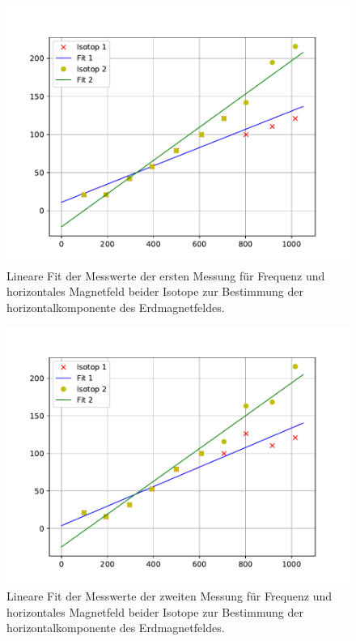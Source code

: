 \begin{figure}[H]
  \centering
  \includegraphics[width=\textwidth]{plots/Bfeldfit1}
  \caption{Lineare Fit der Messwerte der ersten Messung für Frequenz und horizontales Magnetfeld beider Isotope zur Bestimmung der horizontalkomponente des Erdmagnetfeldes.}
  \label{fig:Bfeldfit1}
\end{figure}
\begin{figure}[H]
  \centering
  \includegraphics[width=\textwidth]{plots/Bfeldfit2}
  \caption{Lineare Fit der Messwerte der zweiten Messung für Frequenz und horizontales Magnetfeld beider Isotope zur Bestimmung der horizontalkomponente des Erdmagnetfeldes.}
  \label{fig:Bfeldfit2}
\end{figure}
